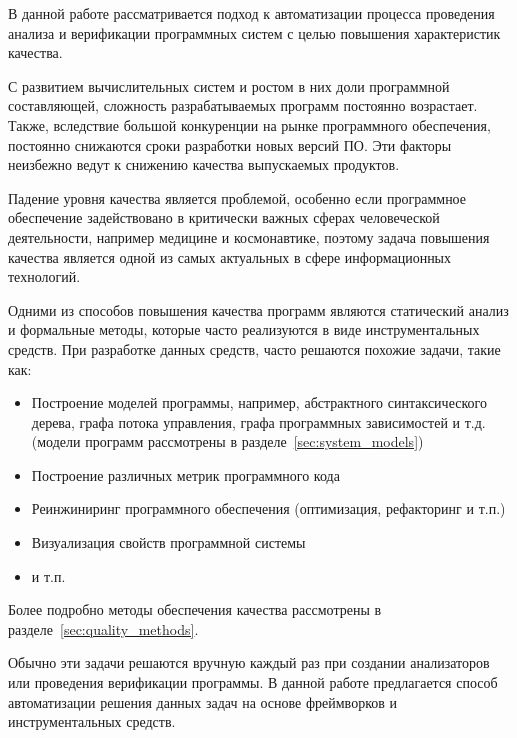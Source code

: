 \intro

В данной работе рассматривается подход к автоматизации процесса проведения
анализа и верификации программных систем с целью повышения характеристик
качества.

С развитием вычислительных систем и ростом в них доли программной составляющей,
сложность разрабатываемых программ постоянно возрастает. Также, вследствие
большой конкуренции на рынке программного обеспечения, постоянно снижаются сроки
разработки новых версий ПО. Эти факторы неизбежно ведут к снижению качества
выпускаемых продуктов.

Падение уровня качества является проблемой, особенно если программное
обеспечение задействовано в критически важных сферах человеческой деятельности,
например медицине и космонавтике, поэтому задача повышения качества является
одной из самых актуальных в сфере информационных технологий.

Одними из способов повышения качества программ являются статический анализ и
формальные методы, которые часто реализуются в виде инструментальных
средств. При разработке данных средств, часто решаются похожие задачи, такие
как:
\begin{itemize}
    \item Построение моделей программы, например, абстрактного синтаксического
    дерева, графа потока управления, графа программных зависимостей и т.д.
    (модели программ рассмотрены в разделе~\ref{sec:system_models})
    \item Построение различных метрик программного кода
    \item Реинжиниринг программного обеспечения (оптимизация, рефакторинг и т.п.)
    \item Визуализация свойств программной системы
    \item и т.п.
\end{itemize}

Более подробно методы обеспечения качества рассмотрены в
разделе~\ref{sec:quality_methods}.

Обычно эти задачи решаются вручную каждый раз при создании анализаторов или
проведения верификации программы. В данной работе предлагается способ
автоматизации решения данных задач на основе фреймворков и инструментальных
средств.

